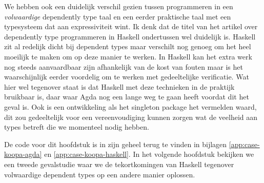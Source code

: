 We hebben ook een duidelijk verschil gezien tussen programmeren in een
\emph{volwaardige} dependently type taal en een eerder praktische taal met een
typesysteem dat aan expressiviteit wint. Ik denk dat de titel van het artikel
over dependently type programmeren in Haskell ondertussen wel duidelijk is.
Haskell zit al redelijk dicht bij dependent types maar verschilt nog genoeg om
het heel moeilijk te maken om op deze manier te werken. In Haskell kan het
extra werk nog steeds aanvaardbaar zijn afhankelijk van de kost van fouten maar
is het waarschijnlijk eerder voordelig om te werken met gedeeltelijke
verificatie. Wat hier wel tegenover staat is dat Haskell met deze technieken in
de praktijk bruikbaar is, daar waar Agda nog een lange weg te gaan heeft
voordat dit het geval is. Ook is een ontwikkeling als het singleton package
\cite{singletonpack} het vermelden waard, dit zou gedeeltelijk voor een
vereenvoudiging kunnen zorgen wat de veelheid aan types betreft die we
momenteel nodig hebben.

De code voor dit hoofdstuk is in zijn geheel terug te vinden in bijlagen
\ref{app:case-koopa-agda} en \ref{app:case-koopa-haskell}. In het volgende
hoofdstuk bekijken we een tweede gevalstudie waar we de tekortkomingen van
Haskell tegenover volwaardige dependent types op een andere manier oplossen.

